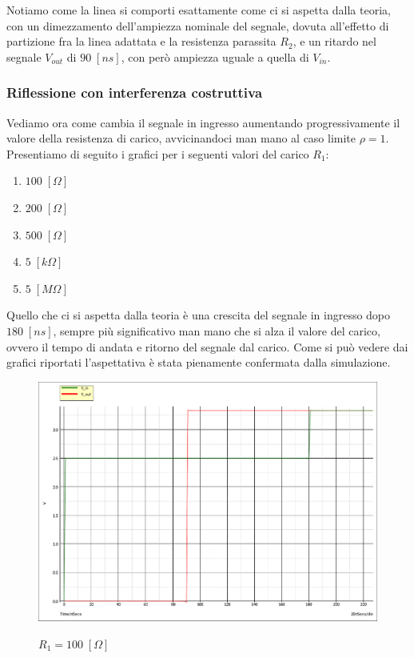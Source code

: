 \documentclass[a4paper,12pt]{report}
\begin{document}
Notiamo come la linea si comporti esattamente come ci si aspetta dalla teoria, con un dimezzamento dell'ampiezza nominale del segnale, dovuta all'effetto di partizione fra la linea adattata e la resistenza parassita $R_2$, e un ritardo nel segnale $V_{out}$ di $90 \; [ns]$, con però ampiezza uguale a quella di $V_{in}$.


\newpage

\subsubsection{Riflessione con interferenza costruttiva}

Vediamo ora come cambia il segnale in ingresso aumentando progressivamente il valore della resistenza di carico, avvicinandoci man mano al caso limite $\rho =1$. Presentiamo di seguito i grafici per i seguenti valori del carico $R_1$: 
\begin{enumerate}
	\item $100 \; [\Omega]$	
	\item $200 \; [\Omega]$	
	\item $500 \; [\Omega]$
	\item $5 \; [k\Omega]$
	\item $5 \; [M\Omega]$
\end{enumerate}

Quello che ci si aspetta dalla teoria è una crescita del segnale in ingresso dopo $180 \; [ns]$, sempre più significativo man mano che si alza il valore del carico, ovvero il tempo di andata e ritorno del segnale dal carico. Come si può vedere dai grafici riportati l'aspettativa è stata pienamente confermata dalla simulazione.

\begin{figure}[!htb]
	\centering
	\includegraphics[width=.8\textwidth]{pictures/100ohm.pdf}
	\label{ergwxxg}
	\caption{\label{luegrevvvgegl} \small $R_1 = 100 \; [\Omega]$ }
\end{figure}
\end{document}
